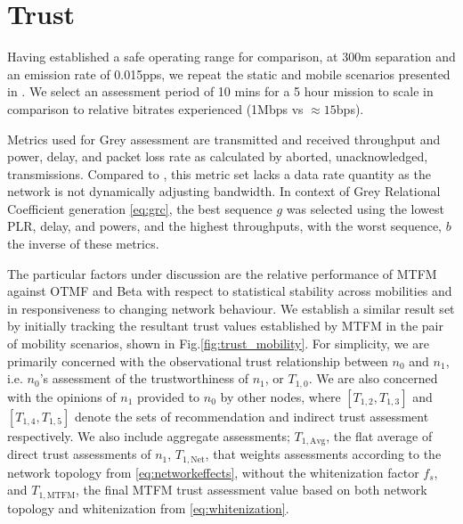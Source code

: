 \documentclass[runningheads,a4paper]{llncs}
\begin{document}
\section{Trust}\label{sec:trustresultsanddiscussion}

Having established a safe operating range for comparison, at 300m separation and an emission rate of 0.015pps, we repeat the static and mobile scenarios presented in \cite{Guo11}. We select an assessment period of 10 mins for a 5 hour mission to scale in comparison to relative bitrates experienced (1Mbps vs $\approx15$bps).

Metrics used for Grey assessment are transmitted and received throughput and power, delay, and packet loss rate as calculated by aborted, unacknowledged, transmissions.
Compared to \cite{Guo11}, this metric set lacks a data rate quantity as the network is not dynamically adjusting bandwidth.
In context of Grey Relational Coefficient generation \eqref{eq:grc}, the best sequence $g$ was selected using the lowest PLR, delay, and powers, and the highest throughputs, with the worst sequence, $b$ the inverse of these metrics.

The particular factors under discussion are the relative performance of MTFM against OTMF and Beta with respect to statistical stability across mobilities and in responsiveness to changing network behaviour. 
We establish a similar result set by initially tracking the resultant trust values established by MTFM in the pair of mobility scenarios, shown in Fig.\ref{fig:trust_mobility}.
For simplicity, we are primarily concerned with the observational trust relationship between $n_0$ and $n_1$, i.e. $n_0$'s assessment of the trustworthiness of $n_1$, or $T_{1,0}$.
We are also concerned with the opinions of $n_1$ provided to $n_0$ by other nodes, where $[T_{1,2},T_{1,3}]$ and $[T_{1,4},T_{1,5}]$ denote the sets of recommendation and indirect trust assessment respectively.
We also include aggregate assessments; $T_{1,\text{Avg}}$, the flat average of direct trust assessments of $n_1$, $T_{1,\text{Net}}$, that weights assessments according to the network topology from \eqref{eq:networkeffects}, without the whitenization factor $f_s$, and $T_{1,\text{MTFM}}$, the final MTFM trust assessment value based on both network topology and whitenization from \eqref{eq:whitenization}.
\end{document}
